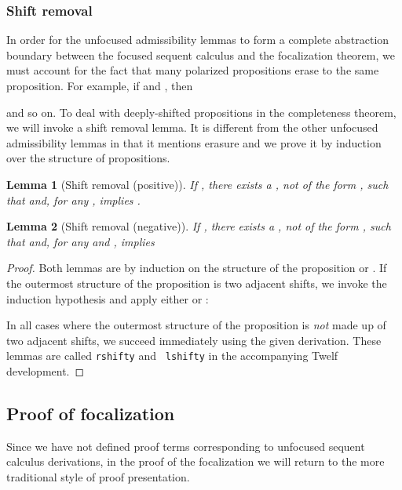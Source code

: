 \documentclass[acmtocl]{robtrans}\pdfoutput=1
\newtheorem{lemma}{Lemma}
\begin{document}
\subsubsection{Shift removal} 

In order for the unfocused admissibility lemmas to form a complete
abstraction boundary between the focused sequent calculus and the
focalization theorem, we must account for the fact that many polarized
propositions erase to the same proposition. For example, if
 and , then

and so on. To deal with deeply-shifted propositions in the
completeness theorem, we will invoke a shift removal lemma. It is
different from the other unfocused admissibility lemmas in that it
mentions erasure and we prove it by induction over the structure of
propositions.

\begin{lemma}[Shift removal (positive)]

If , there exists a , 
  not of the form , such that
 and, for any , 
implies .
\end{lemma}

\begin{lemma}[Shift removal (negative)] 

If , there exists a , 
  not of the form , such that
 and, for any  and ,
 implies 
\end{lemma}

\begin{proof}
Both lemmas are by induction on the structure of the proposition 
or . If the outermost structure of the proposition is two
adjacent shifts, we invoke the induction hypothesis and apply either
 or
:









\bigskip
\noindent
In all cases where the outermost structure of the proposition is {\em
  not} made up of two adjacent shifts, we succeed immediately using
the given derivation.  These lemmas are called {\tt rshifty} and {\tt
  lshifty} in the accompanying Twelf development.
\end{proof}




\subsection{Proof of focalization}
\label{sec:focalizationproof}

Since we have not defined proof terms corresponding to 
unfocused sequent calculus derivations, in
the proof of the focalization we will return to the more
traditional style of proof presentation.
\end{document}

